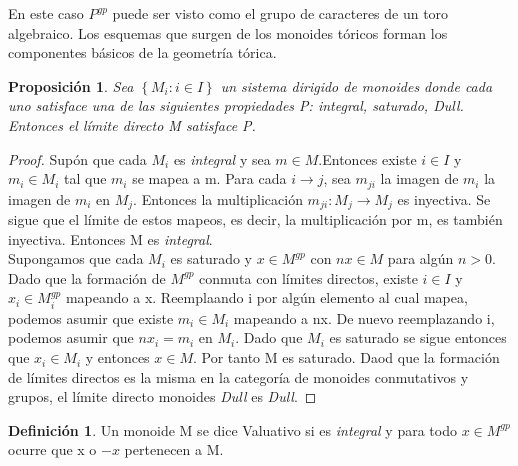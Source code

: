 \documentclass[12pt,spanish]{amsart}
\newcommand{\set}[1]{\left\{{#1}\right\}}
\newtheorem{prop}[Theorem]{Proposición}
\theoremstyle{definition}
\newtheorem{Def}[Theorem]{Definición}
\theoremstyle{remark}
\begin{document}
En este caso $P^{gp}$ puede ser visto como el grupo de caracteres de un toro algebraico. Los esquemas que surgen de los monoides tóricos forman los componentes básicos de la geometría tórica.

\begin{prop}
Sea $\set{M_{i}:i\in I}$ un sistema dirigido de monoides donde cada uno satisface una de las siguientes propiedades P: \textit{integral}, saturado, \textit{Dull}. Entonces el límite directo M satisface P. 
\end{prop}

\begin{proof}
Supón que cada $M_{i}$ es \textit{integral} y sea $m\in M$.Entonces existe $i\in I$ y $m_{i}\in M_{i}$ tal que $m_{i}$ se mapea a m. Para cada $i \to j$, sea $m_{ji}$ la imagen de $m_{i}$  la imagen de $m_{i}$  en $M_{j}$. Entonces la multiplicación $m_{ji}: M_{j} \to M_{j}$ es inyectiva. Se sigue que el límite de estos mapeos, es decir, la multiplicación por m, es también inyectiva. Entonces M es \textit{integral}. \\
Supongamos que cada $M_{i}$ es saturado y $x\in M^{gp}$ con $nx\in M$ para algún $n>0$. Dado que la formación de $M^{gp}$ conmuta con límites directos, existe $i\in I$ y $x_{i}\in M_{i}^{gp}$ mapeando a x. Reemplaando i por algún elemento al cual mapea, podemos asumir que existe $m_{i}\in M_{i}$ mapeando a nx. De nuevo reemplazando i, podemos asumir que $nx_{i}=m_{i}$ en $M_{i}$. Dado que $M_{i}$ es saturado se sigue entonces que $x_{i}\in M_{i}$ y entonces $x\in M$. Por tanto M es saturado. Daod que la formación de límites directos es la misma en la categoría de monoides conmutativos y grupos, el límite directo monoides \textit{Dull} es \textit{Dull}. 
\end{proof}

\begin{Def}
Un monoide M se dice Valuativo si es \textit{integral} y para todo $x\in M^{gp}$ ocurre que x o $-x$ pertenecen a M. 
\end{Def}
\end{document}
